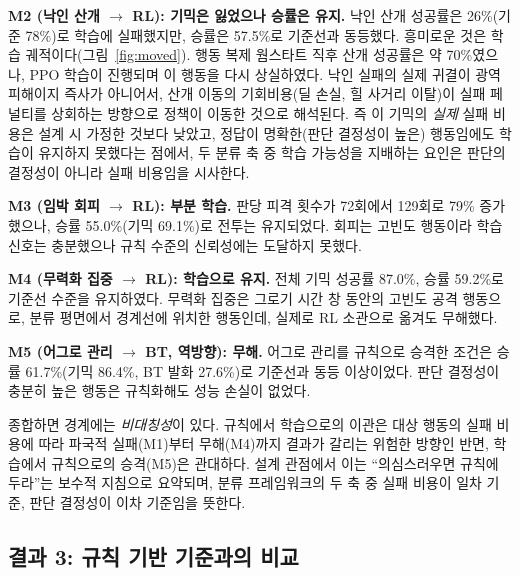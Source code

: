 \documentclass[12pt]{article}      %
\begin{document}
\textbf{M2 (낙인 산개 $\rightarrow$ RL): 기믹은 잃었으나 승률은 유지.} 낙인 산개
성공률은 26\%(기준 78\%)로 학습에 실패했지만, 승률은 57.5\%로 기준선과 동등했다.
흥미로운 것은 학습 궤적이다(그림~\ref{fig:moved}). 행동 복제 웜스타트 직후 산개
성공률은 약 70\%였으나, PPO 학습이 진행되며 이 행동을 다시 상실하였다. 낙인
실패의 실제 귀결이 광역 피해이지 즉사가 아니어서, 산개 이동의 기회비용(딜 손실,
힐 사거리 이탈)이 실패 페널티를 상회하는 방향으로 정책이 이동한 것으로 해석된다.
즉 이 기믹의 \emph{실제} 실패 비용은 설계 시 가정한 것보다 낮았고, 정답이
명확한(판단 결정성이 높은) 행동임에도 학습이 유지하지 못했다는 점에서, 두 분류
축 중 학습 가능성을 지배하는 요인은 판단의 결정성이 아니라 실패 비용임을
시사한다.

\textbf{M3 (임박 회피 $\rightarrow$ RL): 부분 학습.} 판당 피격 횟수가 72회에서
129회로 79\% 증가했으나, 승률 55.0\%(기믹 69.1\%)로 전투는 유지되었다. 회피는
고빈도 행동이라 학습 신호는 충분했으나 규칙 수준의 신뢰성에는 도달하지 못했다.

\textbf{M4 (무력화 집중 $\rightarrow$ RL): 학습으로 유지.} 전체 기믹 성공률
87.0\%, 승률 59.2\%로 기준선 수준을 유지하였다. 무력화 집중은 그로기 시간 창
동안의 고빈도 공격 행동으로, 분류 평면에서 경계선에 위치한 행동인데, 실제로 RL
소관으로 옮겨도 무해했다.

\textbf{M5 (어그로 관리 $\rightarrow$ BT, 역방향): 무해.} 어그로 관리를 규칙으로
승격한 조건은 승률 61.7\%(기믹 86.4\%, BT 발화 27.6\%)로 기준선과 동등 이상이었다.
판단 결정성이 충분히 높은 행동은 규칙화해도 성능 손실이 없었다.

종합하면 경계에는 \emph{비대칭성}이 있다. 규칙에서 학습으로의 이관은 대상 행동의
실패 비용에 따라 파국적 실패(M1)부터 무해(M4)까지 결과가 갈리는 위험한 방향인
반면, 학습에서 규칙으로의 승격(M5)은 관대하다. 설계 관점에서 이는 ``의심스러우면
규칙에 두라''는 보수적 지침으로 요약되며, 분류 프레임워크의 두 축 중 실패 비용이
일차 기준, 판단 결정성이 이차 기준임을 뜻한다.

\subsection{결과 3: 규칙 기반 기준과의 비교}
\label{sec:baseline}
\end{document}
